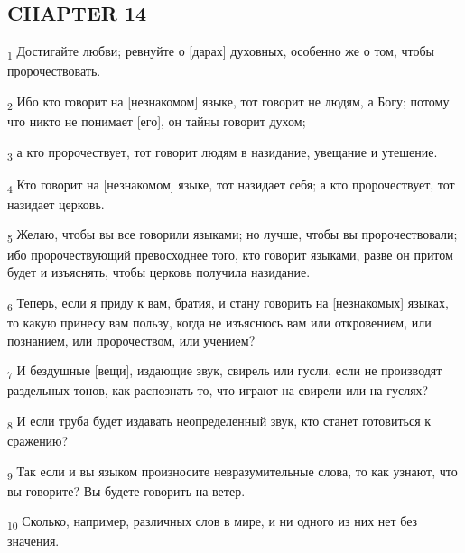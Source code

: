 \subsection{CHAPTER 14}
\begin{tcolorbox}
\textsubscript{1} Достигайте любви; ревнуйте о [дарах] духовных, особенно же о том, чтобы пророчествовать.
\end{tcolorbox}
\begin{tcolorbox}
\textsubscript{2} Ибо кто говорит на [незнакомом] языке, тот говорит не людям, а Богу; потому что никто не понимает [его], он тайны говорит духом;
\end{tcolorbox}
\begin{tcolorbox}
\textsubscript{3} а кто пророчествует, тот говорит людям в назидание, увещание и утешение.
\end{tcolorbox}
\begin{tcolorbox}
\textsubscript{4} Кто говорит на [незнакомом] языке, тот назидает себя; а кто пророчествует, тот назидает церковь.
\end{tcolorbox}
\begin{tcolorbox}
\textsubscript{5} Желаю, чтобы вы все говорили языками; но лучше, чтобы вы пророчествовали; ибо пророчествующий превосходнее того, кто говорит языками, разве он притом будет и изъяснять, чтобы церковь получила назидание.
\end{tcolorbox}
\begin{tcolorbox}
\textsubscript{6} Теперь, если я приду к вам, братия, и стану говорить на [незнакомых] языках, то какую принесу вам пользу, когда не изъяснюсь вам или откровением, или познанием, или пророчеством, или учением?
\end{tcolorbox}
\begin{tcolorbox}
\textsubscript{7} И бездушные [вещи], издающие звук, свирель или гусли, если не производят раздельных тонов, как распознать то, что играют на свирели или на гуслях?
\end{tcolorbox}
\begin{tcolorbox}
\textsubscript{8} И если труба будет издавать неопределенный звук, кто станет готовиться к сражению?
\end{tcolorbox}
\begin{tcolorbox}
\textsubscript{9} Так если и вы языком произносите невразумительные слова, то как узнают, что вы говорите? Вы будете говорить на ветер.
\end{tcolorbox}
\begin{tcolorbox}
\textsubscript{10} Сколько, например, различных слов в мире, и ни одного из них нет без значения.
\end{tcolorbox}
